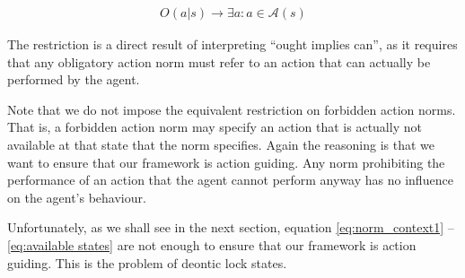 \begin{align}
	O(a | s) \rightarrow \exists a: a \in \mathcal{A}(s) \label{eq:available states}  	
\end{align}  

The restriction is a direct result of interpreting ``ought implies can'', as it requires that any obligatory action norm must refer to an action that can actually be performed by the agent. 

Note that we do not impose the equivalent restriction on forbidden action norms. That is, a forbidden action norm may specify an action that is actually not available at that state that the norm specifies. Again the reasoning is that we want to ensure that our framework is action guiding. Any norm prohibiting the performance of an action that the agent cannot perform anyway has no influence on the agent's behaviour.

Unfortunately, as we shall see in the next section, equation \eqref{eq:norm_context1} -- \eqref{eq:available states} are not enough to ensure that our framework is action guiding. This is the problem of deontic lock states.




